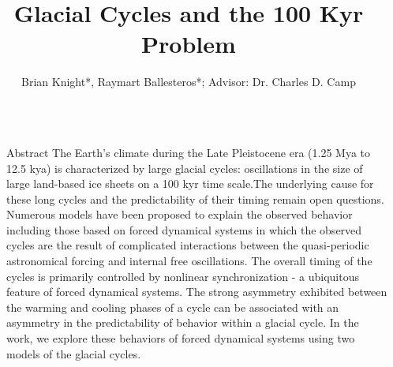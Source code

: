 \documentclass[final]{beamer}
\title{Glacial Cycles and the 100 Kyr Problem}
\author{Brian Knight*, Raymart Ballesteros*; Advisor: Dr. Charles D. Camp}
\institute{Frost Summer Undergraduate Research 2018}
\newlength{\sepwid}
\newlength{\onecolwid}
\newlength{\twocolwid}
\begin{document}
\begin{frame}[t]
  \begin{columns}[t]												%
    \begin{column}{\sepwid}\end{column}			%
    \begin{column}{\twocolwid}
    \begin{columns}[t,totalwidth=\twocolwid]
    \begin{column}{\onecolwid}
    	  \begin{alertblock}{Abstract}
    	  The Earth's climate during the Late Pleistocene era (1.25 Mya to 12.5 kya) is characterized by large glacial cycles: oscillations in the size of large land-based ice sheets on a 100 kyr time scale.The underlying cause for these long cycles and the predictability of their timing remain open questions. Numerous models have been proposed to explain the observed behavior including those based on forced dynamical systems in which the observed cycles are the result of complicated interactions between the quasi-periodic astronomical forcing and internal free oscillations. The overall timing of the cycles is primarily controlled by nonlinear synchronization - a ubiquitous feature of forced dynamical systems. The strong asymmetry exhibited between the warming and cooling phases of a cycle can be associated with an asymmetry in the predictability of behavior within a glacial cycle. In the work, we explore these behaviors of forced dynamical systems using two models of the glacial cycles. 
    	  \end{alertblock}

\end{column}
\end{columns}
\end{column}
\end{columns}
\end{frame}
\end{document}
